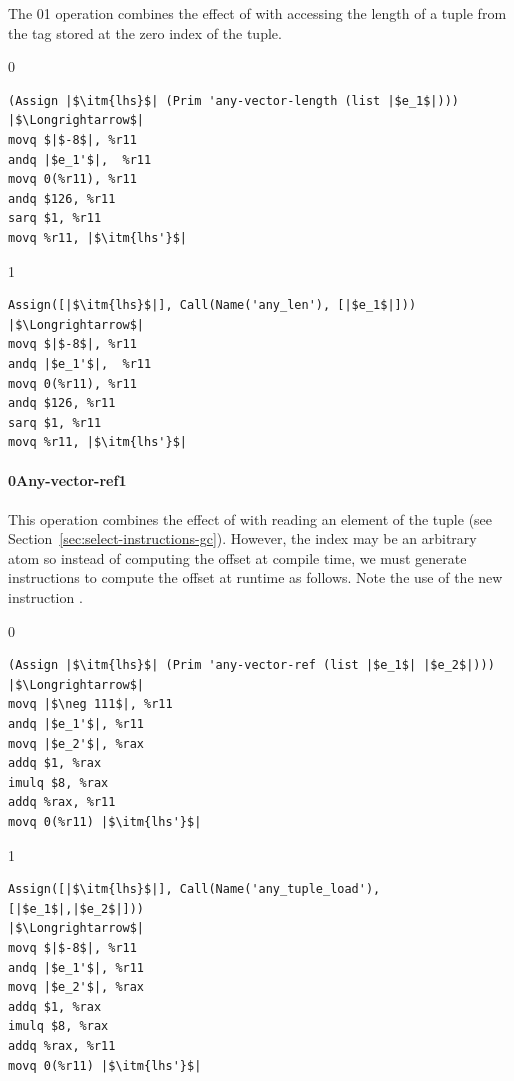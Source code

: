 \documentclass[7x10,nocrop]{TimesAPriori_MIT}%
\def\racketEd{0}
\def\pythonEd{1}
\def\edition{0}
\newcommand{\racket}[1]{{\if\edition\racketEd{#1}\fi}}
\newcommand{\python}[1]{{\if\edition\pythonEd #1\fi}}
\begin{document}
The \racket{}\python{}
operation combines the effect of  with accessing the
length of a tuple from the tag stored at the zero index of the tuple.

{\if\edition\racketEd
\begin{lstlisting}
(Assign |$\itm{lhs}$| (Prim 'any-vector-length (list |$e_1$|)))
|$\Longrightarrow$|
movq $|$-8$|, %r11
andq |$e_1'$|,  %r11
movq 0(%r11), %r11
andq $126, %r11
sarq $1, %r11
movq %r11, |$\itm{lhs'}$|
\end{lstlisting}
\fi}
{\if\edition\pythonEd
\begin{lstlisting}
Assign([|$\itm{lhs}$|], Call(Name('any_len'), [|$e_1$|]))
|$\Longrightarrow$|
movq $|$-8$|, %r11
andq |$e_1'$|,  %r11
movq 0(%r11), %r11
andq $126, %r11
sarq $1, %r11
movq %r11, |$\itm{lhs'}$|
\end{lstlisting}
\fi}

\paragraph{\racket{Any-vector-ref}\python{}}

This operation combines the effect of  with reading an
element of the tuple (see
Section~\ref{sec:select-instructions-gc}). However, the index may be
an arbitrary atom so instead of computing the offset at compile time,
we must generate instructions to compute the offset at runtime as
follows. Note the use of the new instruction .
\begin{center}
\begin{minipage}{0.96\textwidth}
{\if\edition\racketEd    
\begin{lstlisting}
(Assign |$\itm{lhs}$| (Prim 'any-vector-ref (list |$e_1$| |$e_2$|)))
|$\Longrightarrow$|
movq |$\neg 111$|, %r11
andq |$e_1'$|, %r11
movq |$e_2'$|, %rax
addq $1, %rax
imulq $8, %rax
addq %rax, %r11
movq 0(%r11) |$\itm{lhs'}$|
\end{lstlisting}
\fi}
%
{\if\edition\pythonEd    
\begin{lstlisting}
Assign([|$\itm{lhs}$|], Call(Name('any_tuple_load'), [|$e_1$|,|$e_2$|]))
|$\Longrightarrow$|
movq $|$-8$|, %r11
andq |$e_1'$|, %r11
movq |$e_2'$|, %rax
addq $1, %rax
imulq $8, %rax
addq %rax, %r11
movq 0(%r11) |$\itm{lhs'}$|
\end{lstlisting}
\fi}
\end{minipage}
\end{center}
\end{document}
